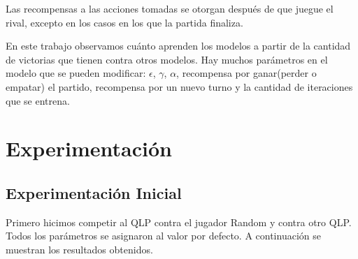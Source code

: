 \documentclass[10pt, a4paper]{article}
\begin{document}
Las recompensas a las acciones tomadas se otorgan después de que juegue el rival, excepto en los casos en los que la partida finaliza.


En este trabajo observamos cuánto aprenden los modelos a partir de la cantidad de victorias que tienen contra otros modelos.
Hay muchos parámetros en el modelo que se pueden modificar:
$\epsilon$,  $\gamma$, $\alpha$, recompensa por ganar(perder o empatar) el partido, recompensa por un nuevo turno y la cantidad de iteraciones que se entrena.


\section{Experimentación}


\subsection{Experimentación Inicial}


Primero hicimos competir al QLP contra el jugador Random y contra otro QLP. Todos los parámetros se asignaron al valor por defecto. A continuación se muestran los resultados obtenidos.
\end{document}
